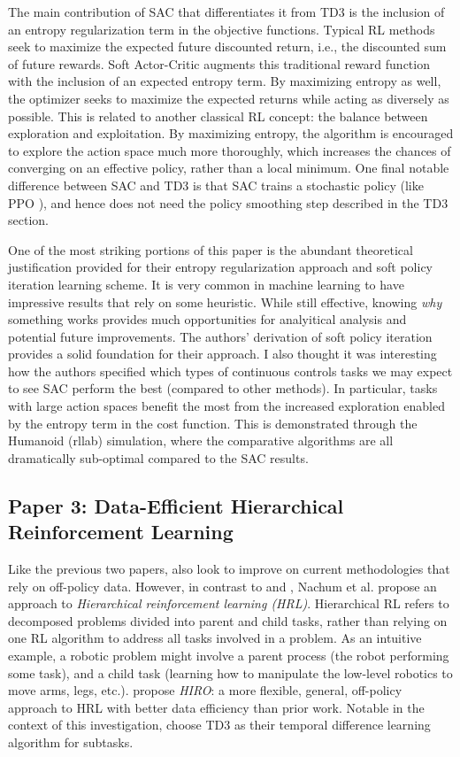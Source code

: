 \documentclass{article}
\begin{document}
The main contribution of SAC that differentiates it from TD3 is the inclusion of an entropy regularization term in the objective functions. Typical RL methods seek to maximize the expected future discounted return, i.e., the discounted sum of future rewards. Soft Actor-Critic augments this traditional reward function with the inclusion of an expected entropy term. By maximizing entropy as well, the optimizer seeks to maximize the expected returns while acting as diversely as possible. This is related to another classical RL concept: the balance between exploration and exploitation. By maximizing entropy, the algorithm is encouraged to explore the action space much more thoroughly, which increases the chances of converging on an effective policy, rather than a local minimum. One final notable difference between SAC and TD3 is that SAC trains a stochastic policy (like PPO \citep{ppo}), and hence does not need the policy smoothing step described in the TD3 section.

One of the most striking portions of this paper is the abundant theoretical justification provided for their entropy regularization approach and soft policy iteration learning scheme. It is very common in machine learning to have impressive results that rely on some heuristic. While still effective, knowing \textit{why} something works provides much opportunities for analyitical analysis and potential future improvements. The authors' derivation of soft policy iteration provides a solid foundation for their approach. I also thought it was interesting how the authors specified which types of continuous controls tasks we may expect to see SAC perform the best (compared to other methods). In particular, tasks with large action spaces benefit the most from the increased exploration enabled by the entropy term in the cost function. This is demonstrated through the Humanoid (rllab) simulation, where the comparative algorithms are all dramatically sub-optimal compared to the SAC results.

\subsection{Paper 3: Data-Efficient Hierarchical Reinforcement Learning \citep{ofir}}
Like the previous two papers, \citep{ofir} also look to improve on current methodologies that rely on off-policy data. However, in contrast to \cite{sac} and \cite{td3},  Nachum et al. propose an approach to \textit{Hierarchical reinforcement learning (HRL)}. Hierarchical RL refers to decomposed problems divided into parent and child tasks, rather than relying on one RL algorithm to address all tasks involved in a problem. As an intuitive example, a robotic problem might involve a parent process (the robot performing some task), and a child task (learning how to manipulate the low-level robotics to move arms, legs, etc.). \citep{ofir} propose \textit{HIRO}: a more flexible, general, off-policy approach to HRL with better data efficiency than prior work. Notable in the context of this investigation, \citep{ofir} choose TD3 \cite{td3} as their temporal difference learning algorithm for subtasks.
\end{document}
